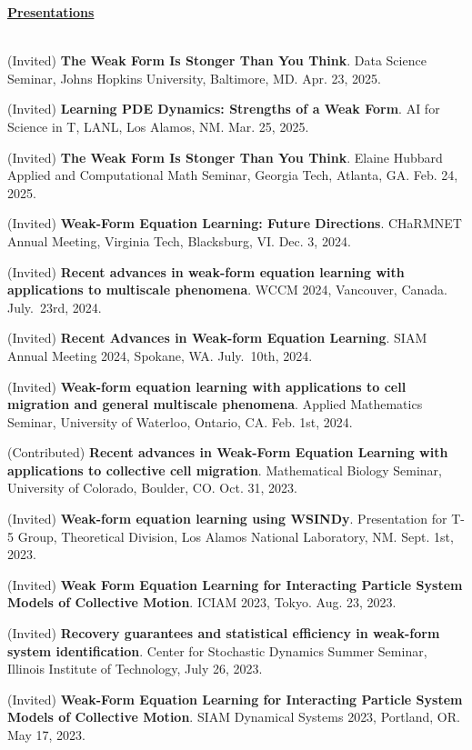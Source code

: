 \documentclass[letterpaper,11pt,oneside]{article}
\newcommand{\headr}[1]{\vspace{10pt}\uline{\Large{\textbf{#1}} \hfill } \\ \vspace{-10pt}\\}
\begin{document}
\headr{Presentations}
\vspace{-0.5cm}
\begin{enumerate}[label={[\arabic*]}]
\item (Invited) \textbf{The Weak Form Is Stonger Than You Think}. Data Science Seminar, Johns Hopkins University, Baltimore, MD. Apr. 23, 2025.
\item (Invited) \textbf{Learning PDE Dynamics: Strengths of a Weak Form}. AI for Science in T, LANL, Los Alamos, NM. Mar. 25, 2025.
\item (Invited) \textbf{The Weak Form Is Stonger Than You Think}. Elaine Hubbard Applied and Computational Math Seminar, Georgia Tech, Atlanta, GA. Feb. 24, 2025.
\item (Invited) \textbf{Weak-Form Equation Learning: Future Directions}. CHaRMNET Annual Meeting, Virginia Tech, Blacksburg, VI. Dec. 3, 2024.
\item (Invited) \textbf{Recent advances in weak-form equation learning
with applications to multiscale phenomena}. WCCM 2024, Vancouver, Canada. July.\ 23rd, 2024.
\item (Invited) \textbf{Recent Advances in Weak-form Equation Learning}. SIAM Annual Meeting 2024, Spokane, WA. July.\ 10th, 2024.
\item (Invited) \textbf{Weak-form equation learning with applications to cell migration and general multiscale phenomena}. Applied Mathematics Seminar, University of Waterloo, Ontario, CA. Feb. 1st, 2024.
\item (Contributed) \textbf{Recent advances in Weak-Form Equation Learning with
applications to collective cell migration}. Mathematical Biology Seminar, University of Colorado, Boulder, CO. Oct. 31, 2023.
\item (Invited) \textbf{Weak-form equation learning using WSINDy}. Presentation for T-5 Group, Theoretical Division, Los Alamos National Laboratory, NM. Sept. 1st, 2023.
\item (Invited) \textbf{Weak Form Equation Learning for Interacting Particle System
Models of Collective Motion}. ICIAM 2023, Tokyo. Aug. 23, 2023.
\item (Invited) \textbf{Recovery guarantees and statistical efficiency in weak-form
system identification}. Center for Stochastic Dynamics Summer Seminar, Illinois Institute of Technology, July 26, 2023.
\item (Invited) \textbf{Weak-Form Equation Learning for Interacting Particle System Models of Collective Motion}. SIAM Dynamical Systems 2023, Portland, OR. May 17, 2023.

\end{enumerate}
\end{document}
